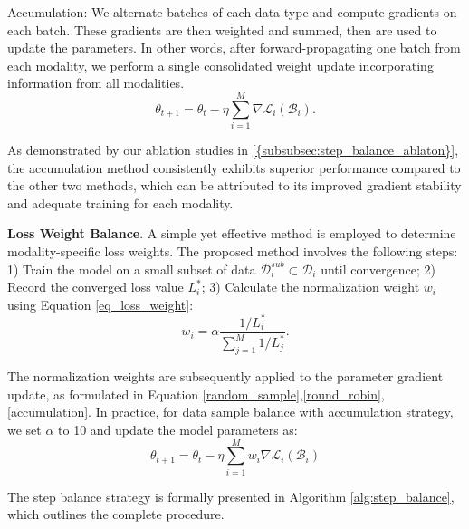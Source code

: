 Accumulation: We alternate batches of each data type and compute gradients on each batch. These gradients are then weighted and summed, then are used to update the parameters.
In other words, after forward-propagating one batch from each modality, we perform a single consolidated weight update incorporating information from all modalities.
\begin{equation}\label{accumulation}
    \theta_{t+1} = \theta_t - \eta \sum_{i=1}^M \nabla \mathcal{L}_i(\mathcal{B}_i).
\end{equation}

As demonstrated by our ablation studies in \cref{{subsubsec:step_balance_ablaton}}, the accumulation method consistently exhibits superior performance compared to the other two methods, which can be attributed to its improved gradient stability and adequate training for each modality.


\textbf{Loss Weight Balance}.
A simple yet effective method is employed to determine modality-specific loss weights. The proposed method involves the following steps:
1) Train the model on a small subset of data $\mathcal{D}_i^{sub} \subset \mathcal{D}_i$ until convergence;
2) Record the converged loss value $L_i^*$;
3) Calculate the normalization weight $w_i$ using Equation \ref{eq_loss_weight}:
\begin{equation}\label{eq_loss_weight}
    w_i = \alpha\frac{1/L_i^*}{\sum_{j=1}^M 1/L_j^*}.
\end{equation}

The normalization weights are subsequently applied to the parameter gradient update, as formulated in Equation \eqref{random_sample},\eqref{round_robin},\eqref{accumulation}. In practice, for data sample balance with accumulation strategy, we set $\alpha$ to 10 and update the model parameters as:
\begin{equation}
    \theta_{t+1} = \theta_t - \eta \sum_{i=1}^M w_i \nabla \mathcal{L}_i(\mathcal{B}_i)
\end{equation}

The step balance strategy is formally presented in Algorithm \ref{alg:step_balance}, which outlines the complete procedure.



